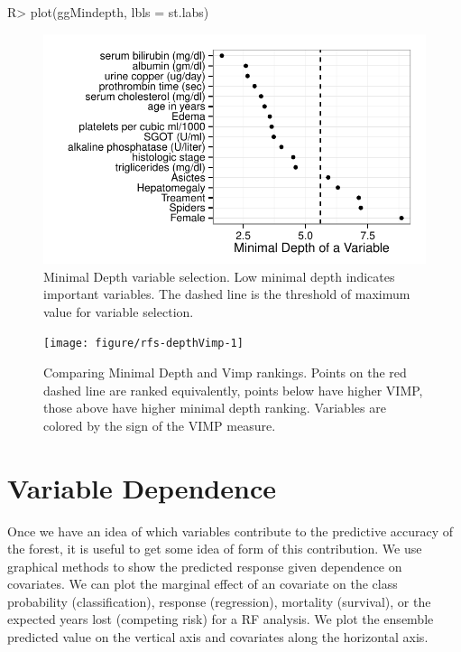 \documentclass[nojss]{jss}
\begin{document}
\begin{Schunk}
\begin{Sinput}
R> plot(ggMindepth, lbls = st.labs)
\end{Sinput}
\begin{figure}[!htpb]

{\centering \includegraphics[width=\maxwidth]{figure/rfs-mindepth-plot-1} 

}

\caption[Minimal Depth variable selection]{Minimal Depth variable selection. Low minimal depth indicates important variables. The dashed line is the threshold of maximum value for variable selection.\label{fig:mindepth-plot}}
\end{figure}
\end{Schunk}

\begin{Schunk}
\begin{figure}[!htpb]

{\centering \texttt{[image: figure/rfs-depthVimp-1]} 

}

\caption[Comparing Minimal Depth and Vimp rankings]{Comparing Minimal Depth and Vimp rankings. Points on the red dashed line are ranked equivalently, points below have higher VIMP, those above have higher minimal depth ranking. Variables are colored by the sign of the VIMP measure.\label{fig:depthVimp}}
\end{figure}
\end{Schunk}

\section{Variable Dependence}\label{S:dependence}
Once we have an idea of which variables contribute to the predictive accuracy of the forest, it is useful to get some idea of form of this contribution. We use graphical methods to show the predicted response given dependence on covariates. We can plot the marginal effect of an covariate on the class probability (classification), response (regression), mortality (survival), or the expected years lost (competing risk) for a RF analysis. We plot the ensemble predicted value on the vertical axis and covariates along the horizontal axis.
\end{document}
